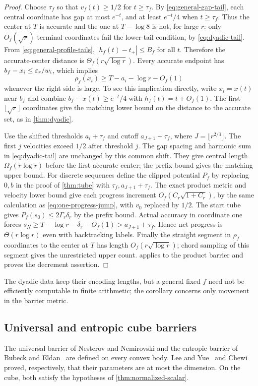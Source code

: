 \begin{proof}
Choose $\tau_f$ so that $v_f(t)\geq1/2$ for $t\geq\tau_f$.
By \eqref{eq:general-gap-tail}, each central coordinate has gap at
most $e^{-t}$, and at least $e^{-t}/4$ when $t\geq\tau_f$.
Thus the center at $T$ is accurate and the one at $T-\log8$ is
not, for large $r$: only $O_f(\sqrt r)$ terminal coordinates fail
the lower-tail condition, by \eqref{eq:dyadic-tail}. From
\eqref{eq:general-profile-tails},
$|h_f(t)-t_+|\leq B_f$ for all $t$. Therefore the accurate-center
distance is $\Theta_f(r\sqrt{\log r})$. Every accurate endpoint
has $b_f-x_i\leq\varepsilon_r/w_i$, which implies
\[
 \rho_f(x_i)\geq T-a_i-\log r-O_f(1)
\]
whenever the right side is large. To see this implication directly,
write $x_i=x(t)$ near $b_f$ and combine
$b_f-x(t)\geq e^{-t}/4$ with $h_f(t)=t+O_f(1)$.
The first $\lfloor\sqrt r\rfloor$ coordinates give the matching
lower bound on the distance to the accurate set, as in \cref{thm:dyadic}.

Use the shifted thresholds $a_i+\tau_f$ and cutoff
$a_{J+1}+\tau_f$, where $J=\lfloor r^{2/3}\rfloor$.
The first $j$ velocities exceed $1/2$ after threshold $j$.
The gap spacing and harmonic sum in \eqref{eq:dyadic-tail}
are unchanged by this common shift. They give central length
$\Omega_f(r\log r)$ before the first accurate center; the prefix
bound gives the matching upper bound.
For discrete sequences define the clipped potential $P_f$ by replacing
$0,b$ in the proof of \cref{thm:tube} with
$\tau_f,a_{J+1}+\tau_f$. The exact product metric and velocity
lower bound give each progress increment
$O_f(C_r\sqrt{1+C_r})$, by the same calculation as
\eqref{eq:one-progress-jump}, with $v_0$ replaced by $1/2$.
The start tube gives
$P_f(s_0)\leq2\Gamma_r\delta_r$ by the prefix bound.
Actual accuracy in coordinate one forces
$s_N\geq T-\log r-\delta_r-O_f(1)>a_{J+1}+\tau_f$.
Hence net progress is $\Theta(r\log r)$ even with backtracking labels.
Finally the straight segment in $\rho_f$ coordinates to the center
at $T$ has length $O_f(r\sqrt{\log r})$; chord sampling of this
segment gives the unrestricted upper count. 
applies to the product barrier and proves the decrement assertion.
\end{proof}
The dyadic data keep their encoding lengths, but a general fixed $f$
need not be efficiently computable in finite arithmetic; the corollary
concerns only movement in the barrier metric.

\subsection{Universal and entropic cube barriers}
The universal barrier of Nesterov and Nemirovski and the entropic
barrier of Bubeck and Eldan~\cite{BubeckEldan2019} are defined on every
convex body. Lee and Yue~\cite{LeeYue2021} and Chewi~\cite{Chewi2023}
proved, respectively, that their parameters are at most the dimension.
On the cube, both satisfy the hypotheses of
\cref{thm:normalized-scalar}.

